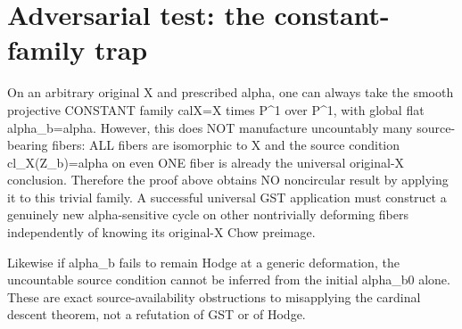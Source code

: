 \documentclass[11pt]{article}
\begin{document}
\section{Adversarial test: the constant-family trap}
On an arbitrary original X and prescribed alpha,
one can always take the smooth projective
CONSTANT family calX=X times P^1 over P^1,
with global flat alpha_b=alpha.
However, this does NOT manufacture
uncountably many source-bearing fibers:
ALL fibers are isomorphic to X and
the source condition cl_X(Z_b)=alpha
on even ONE fiber is already the
universal original-X conclusion.
Therefore the proof above obtains
NO noncircular result by applying it
to this trivial family.
A successful universal GST application
must construct a genuinely new
alpha-sensitive cycle on other nontrivially
deforming fibers independently of
knowing its original-X Chow preimage.

Likewise if alpha_b fails to remain Hodge
at a generic deformation, the uncountable
source condition cannot be inferred
from the initial alpha_b0 alone.
These are exact source-availability
obstructions to misapplying the
cardinal descent theorem, not a
refutation of GST or of Hodge.
\end{document}
